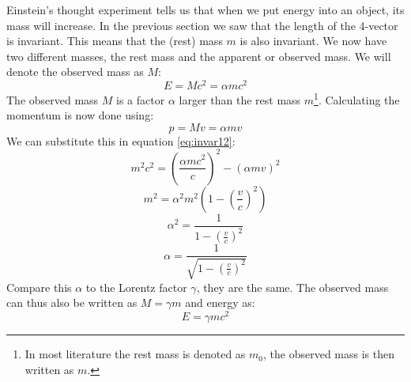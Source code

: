 \documentclass[12pt,a4paper]{article}
\numberwithin{equation}{section}
\numberwithin{figure}{section}
\numberwithin{table}{section}
\begin{document}
Einstein's thought experiment tells us that when we put energy into an object, its mass will increase. In the previous section we saw that the length of the 4-vector is invariant. This means that the (rest) mass $m$ is also invariant. We now have two different masses, the rest mass and the apparent or observed mass. We will denote the observed mass as $M$:
\begin{equation}\label{eq:einstein11}
E=Mc^2=\alpha m c^2
\end{equation}
The observed mass $M$ is a factor $\alpha$ larger than the rest mass $m$\footnote{In most literature the rest mass is denoted as $m_0$, the observed mass is then written as $m$.}. Calculating the momentum is now done using:
\begin{equation}\label{eq:einstein12}
p=Mv=\alpha mv
\end{equation}
We can substitute this in equation \ref{eq:invar12}:
\begin{equation}\label{eq:einstein13}
m^2 c^2 =\left( \frac{\alpha m c^2}{c} \right)^2 - (\alpha m v)^2
\end{equation}
\begin{equation}\label{eq:einstein14}
m^2 = \alpha^2 m^2 \left(1-\left(  \frac{v}{c} \right)^2 \right)
\end{equation}
\begin{equation}\label{eq:einstein15}
\alpha^2 = \frac{1}{1-\left( \frac{v}{c} \right)^2 }
\end{equation}
\begin{equation}\label{eq:einstein16}
\alpha = \frac{1}{\sqrt{1-\left( \frac{v}{c} \right)^2}}
\end{equation}
Compare this $\alpha$ to the Lorentz factor $\gamma$, they are the same. The observed mass can thus also be written as $M=\gamma m$ and energy as:
\begin{equation}\label{eq:einstein17}
E=\gamma m c^2
\end{equation}
\end{document}
